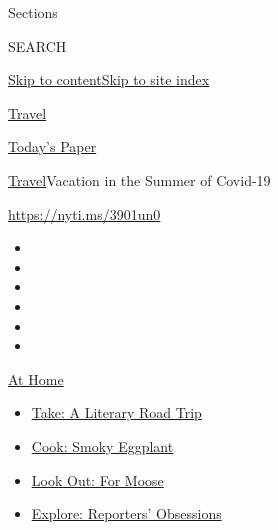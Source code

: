 Sections

SEARCH

\protect\hyperlink{site-content}{Skip to
content}\protect\hyperlink{site-index}{Skip to site index}

\href{https://www.nytimes3xbfgragh.onion/section/travel}{Travel}

\href{https://myaccount.nytimes3xbfgragh.onion/auth/login?response_type=cookie\&client_id=vi}{}

\href{https://www.nytimes3xbfgragh.onion/section/todayspaper}{Today's
Paper}

\href{/section/travel}{Travel}\textbar{}Vacation in the Summer of
Covid-19

\url{https://nyti.ms/3901un0}

\begin{itemize}
\item
\item
\item
\item
\item
\item
\end{itemize}

\href{https://www.nytimes3xbfgragh.onion/spotlight/at-home?action=click\&pgtype=Article\&state=default\&region=TOP_BANNER\&context=at_home_menu}{At
Home}

\begin{itemize}
\tightlist
\item
  \href{https://www.nytimes3xbfgragh.onion/2020/07/28/books/time-for-a-literary-road-trip.html?action=click\&pgtype=Article\&state=default\&region=TOP_BANNER\&context=at_home_menu}{Take:
  A Literary Road Trip}
\item
  \href{https://www.nytimes3xbfgragh.onion/2020/07/29/magazine/bored-with-your-home-cooking-some-smoky-eggplant-will-fix-that.html?action=click\&pgtype=Article\&state=default\&region=TOP_BANNER\&context=at_home_menu}{Cook:
  Smoky Eggplant}
\item
  \href{https://www.nytimes3xbfgragh.onion/2020/07/27/travel/moose-michigan-isle-royale.html?action=click\&pgtype=Article\&state=default\&region=TOP_BANNER\&context=at_home_menu}{Look
  Out: For Moose}
\item
  \href{https://www.nytimes3xbfgragh.onion/interactive/2020/at-home/even-more-reporters-editors-diaries-lists-recommendations.html?action=click\&pgtype=Article\&state=default\&region=TOP_BANNER\&context=at_home_menu}{Explore:
  Reporters' Obsessions}
\end{itemize}

